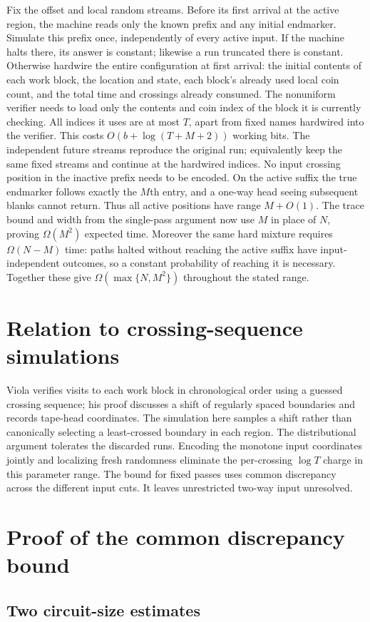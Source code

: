\documentclass[11pt]{article}
\begin{document}
Fix the offset and local random streams. Before its first arrival at the active region, the machine reads only the known prefix and any initial endmarker. Simulate this prefix once, independently of every active input. If the machine halts there, its answer is constant; likewise a run truncated there is constant. Otherwise hardwire the entire configuration at first arrival: the initial contents of each work block, the location and state, each block's already used local coin count, and the total time and crossings already consumed. The nonuniform verifier needs to load only the contents and coin index of the block it is currently checking. All indices it uses are at most $T$, apart from fixed names hardwired into the verifier. This costs $O(b+\log(T+M+2))$ working bits. The independent future streams reproduce the original run; equivalently keep the same fixed streams and continue at the hardwired indices. No input crossing position in the inactive prefix needs to be encoded. On the active suffix the true endmarker follows exactly the $M$th entry, and a one-way head seeing subsequent blanks cannot return. Thus all active positions have range $M+O(1)$. The trace bound and width from the single-pass argument now use $M$ in place of $N$, proving $\Omega(M^2)$ expected time. Moreover the same hard mixture requires $\Omega(N-M)$ time: paths halted without reaching the active suffix have input-independent outcomes, so a constant probability of reaching it is necessary. Together these give $\Omega(\max\{N,M^2\})$ throughout the stated range.

\section{Relation to crossing-sequence simulations}
Viola \cite[\S\S3--4]{viola} verifies visits to each work block in chronological order using a guessed crossing sequence; his proof discusses a shift of regularly spaced boundaries and records tape-head coordinates. The simulation here samples a shift rather than canonically selecting a least-crossed boundary in each region. The distributional argument tolerates the discarded runs. Encoding the monotone input coordinates jointly and localizing fresh randomness eliminate the per-crossing $\log T$ charge in this parameter range. The bound for fixed passes uses common discrepancy across the different input cuts. It leaves unrestricted two-way input unresolved.
\appendix
\section{Proof of the common discrepancy bound}\subsection{Two circuit-size estimates}
\end{document}

